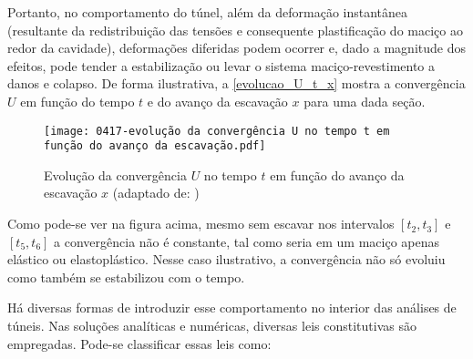 Portanto, no comportamento do túnel, além da deformação instantânea (resultante da redistribuição das tensões e consequente plastificação do maciço ao redor da cavidade), deformações diferidas podem ocorrer e, dado a magnitude dos efeitos, pode tender a estabilização ou levar o sistema maciço-revestimento a danos e colapso. De forma ilustrativa, a \autoref{evolucao_U_t_x} mostra a convergência $U$ em função do tempo $t$ e do avanço da escavação $x$ para uma dada seção.

\begin{figure}[H]
	\begin{center}
		\texttt{[image: 0417-evolução da convergência U no tempo t em função do avanço da escavação.pdf]}
	\end{center}
	\caption{\label{evolucao_U_t_x}Evolução da convergência $U$ no tempo $t$ em função do avanço da escavação $x$ (adaptado de: )}
\end{figure}

Como pode-se ver na figura acima, mesmo sem escavar nos intervalos $[t_2,t_3]$ e $[t_5,t_6]$ a convergência não é constante, tal como seria em um maciço apenas elástico ou elastoplástico. Nesse caso ilustrativo, a convergência não só evoluiu como também se estabilizou com o tempo. 

Há diversas formas de introduzir esse comportamento no interior das análises de túneis. Nas soluções analíticas e numéricas, diversas leis constitutivas são empregadas. Pode-se classificar essas leis como: 

